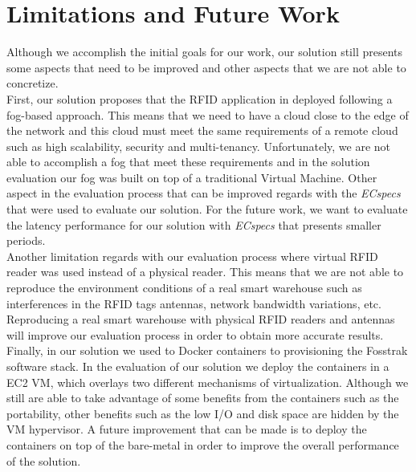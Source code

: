 \section{Limitations and Future Work}
\label{sec:limitations_and_future_work}
Although we accomplish the initial goals for our work, our solution still presents some aspects that
need to be improved and other aspects that we are not able to concretize.\\

First, our solution proposes that the \gls{RFID} application in deployed following a fog-based approach.
This means that we need to have a cloud close to the edge of the network and this cloud must meet
the same requirements of a remote cloud such as high scalability, security and multi-tenancy.
Unfortunately, we are not able to accomplish a fog that meet these requirements and in the solution
evaluation our fog was built on top of a traditional Virtual Machine. Other aspect in the evaluation
process that can be improved regards with the \textit{ECspecs} that were used to evaluate our solution.
For the future work, we want to evaluate the latency performance for our solution with \textit{ECspecs}
that presents smaller periods.\\

Another limitation regards with our evaluation process where virtual \gls{RFID} reader was used
instead of a physical reader. This means that we are not able to reproduce the environment conditions
of a real smart warehouse such as interferences in the \gls{RFID} tags antennas, network bandwidth
variations, etc. Reproducing a real smart warehouse with physical \gls{RFID} readers and antennas
will improve our evaluation process in order to obtain more accurate results.\\

Finally, in our solution we used to Docker containers to provisioning the Fosstrak software stack.
In the evaluation of our solution we deploy the containers in a \gls{EC2} \gls{VM}, which overlays two
different mechanisms of virtualization. Although we still are able to take advantage of some benefits
from the containers such as the portability, other benefits such as the low I/O and disk space are
hidden by the \gls{VM} hypervisor. A future improvement that can be made is to deploy the containers
on top of the bare-metal in order to improve the overall performance of the solution.
